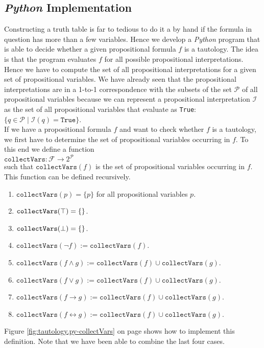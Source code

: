 \subsection{\textsl{Python} Implementation}
Constructing a truth table is far to tedious to do it a by hand if the formula in question has more than a few
variables.  Hence we develop a \textsl{Python} program that is able to decide whether a given propositional
formula $f$ is a tautology.  The idea is that the program evaluates $f$ for all possible propositional
interpretations.  Hence we have to compute the set of all propositional interpretations for a given set of
propositional variables.  We have already seen that the propositional interpretations are in a 1-to-1
correspondence with the subsets of the set $\mathcal{P}$ of all propositional variables because we can
represent a propositional interpretation $\mathcal{I}$ as the set of all propositional variables that evaluate
as \texttt{True}:
\\[0.2cm]
\hspace*{1.3cm}
$\bigl\{ q \in \mathcal{P} \mid \mathcal{I}(q) = \mathtt{True} \bigr\}$.
\\[0.2cm]
If we have a propositional formula $f$ and want to check whether $f$ is a tautology, we first have to determine
the set of propositional variables occurring in $f$.
To this end we define a function
\\[0.2cm]
\hspace*{1.3cm}
$\texttt{collectVars}: \mathcal{F} \rightarrow 2^{\mathcal{P}}$
\\[0.2cm]
such that $\mathtt{collectVars}(f)$ is the set of propositional variables occurring in $f$.  This function can
be defined recursively.
\begin{enumerate}
\item $\mathtt{collectVars}(p) = \{ p \}$ \quad for all propositional variables $p$.
\item $\mathtt{collectVars}(\top) = \{\}$.
\item $\mathtt{collectVars}(\bot) = \{\}$.
\item $\mathtt{collectVars}(\neg f) := \mathtt{collectVars}(f)$.
\item $\mathtt{collectVars}(f \wedge g) := \mathtt{collectVars}(f) \cup \mathtt{collectVars}(g)$.
\item $\mathtt{collectVars}(f \vee g) := \mathtt{collectVars}(f) \cup \mathtt{collectVars}(g)$.
\item $\mathtt{collectVars}(f \rightarrow g) := \mathtt{collectVars}(f) \cup \mathtt{collectVars}(g)$.
\item $\mathtt{collectVars}(f \leftrightarrow g) := \mathtt{collectVars}(f) \cup \mathtt{collectVars}(g)$.
\end{enumerate}
Figure \ref{fig:tautology.py-collectVars} on page \pageref{fig:tautology.py-collectVars} shows how to implement
this definition.  Note that we have been able to combine the last four cases.

